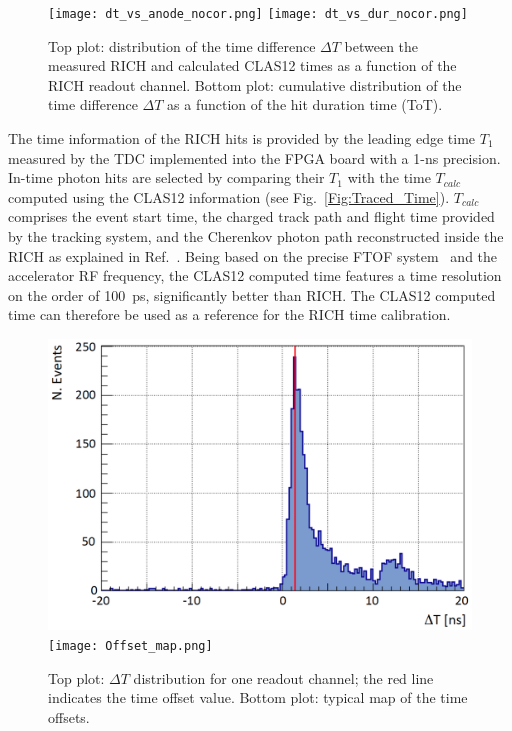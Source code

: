 \documentclass[5p,times,twocolumn]{elsarticle}
\begin{document}
\begin{figure}[t]
\begin{center}
\texttt{[image: dt\_vs\_anode\_nocor.png]}
\texttt{[image: dt\_vs\_dur\_nocor.png]}
\end{center}
\caption{Top plot: distribution of the time difference $\Delta T$ between the measured RICH and calculated CLAS12
  times as a function of the RICH readout channel. Bottom plot: cumulative distribution of the time difference
  $\Delta T$ as a function of the hit duration time (ToT).}
\label{fig:Time_uncorr}
\end{figure}

The time information of the RICH hits is provided by the leading edge time $T_1$ measured by the TDC implemented
into the FPGA board with a 1-ns precision. In-time photon hits are selected by comparing their $T_1$ with the time
$T_{calc}$ computed using the CLAS12 information (see Fig.~\ref{Fig:Traced_Time}). $T_{calc}$ comprises the event
start time, the charged track path and flight time provided by the tracking system, and the Cherenkov photon path
reconstructed inside the RICH as explained in Ref.~\cite{recon-nim}. Being based on the precise FTOF
system~\cite{REF:ftof-nim} and the accelerator RF frequency, the CLAS12 computed time features a time resolution on the order of 100~ps,
significantly better than RICH. The CLAS12 computed time can therefore be used as a reference for the RICH time calibration.

\begin{figure}[t]
\begin{center}
\includegraphics[width=0.9\columnwidth]{Toffset_ch2913_v2.png}
\texttt{[image: Offset\_map.png]}
\end{center}
\caption{Top plot: $\Delta T$ distribution for one readout channel; the red line indicates the time offset value.
  Bottom plot: typical map of the time offsets.}
\label{fig:Toffset}
\end{figure}
\end{document}
